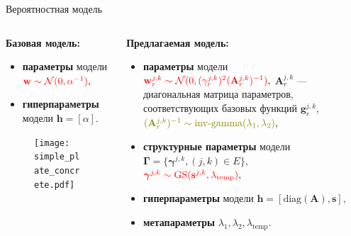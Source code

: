 \documentclass[10pt,pdf,utf8,russian,aspectratio=169]{beamer}
\begin{document}
\begin{frame}{Вероятностная модель}


\begin{columns}
\begin{column}{0.4\textwidth}
\textbf{Базовая модель:} %
\begin{itemize}
\item \textbf{параметры} модели\\ $\textcolor{red}{\mathbf{w} \sim \mathcal{N}(0, \alpha^{-1})},$
\item \textbf{гиперпараметры} модели $\mathbf{h} = [\alpha].$
\end{itemize}
\begin{figure}
\texttt{[image: simple\_plate\_concrete.pdf]}
\end{figure}
\end{column}
\begin{column}{0.6\textwidth}
\textbf{Предлагаемая модель: }
\begin{itemize}
\item \textbf{параметры} модели\\ $\textcolor{red}{\mathbf{w}_r^{j,k} \sim \mathcal{N}(0, (\gamma_{r}^{j,k})^2 (\mathbf{A}_r^{j,k})^{-1})},$
$\mathbf{A}_r^{j,k}$ --- диагональная матрица параметров, соответствующих базовых функций $\mathbf{g}_r^{j,k}$,
\\$\textcolor{olive}{(\mathbf{A}_r^{j,k})^{-1} \sim \text{inv-gamma}(\lambda_1,\lambda_2)},$

\item \textbf{структурные параметры} модели \\$\boldsymbol{\Gamma} = \{\boldsymbol{\gamma}^{j,k}, (j,k) \in E\},$ \\$\textcolor{red}{\boldsymbol{\gamma}^{j,k} \sim \text{GS}(\mathbf{s}^{j,k}, \lambda_\text{temp})},$ 
\item \textbf{гиперпараметры} модели $\mathbf{h} = [\text{diag}(\mathbf{A}), \mathbf{s} ],$
\item \textbf{метапараметры} $\lambda_1,\lambda_2,\lambda_\text{temp}$.
\end{itemize}

\end{column}

\end{columns}

%

\end{frame}
\end{document}
